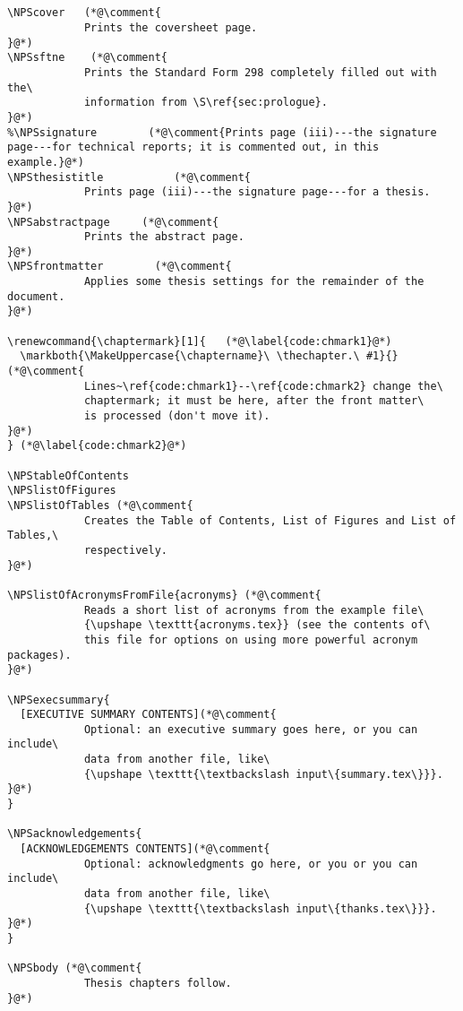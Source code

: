 \begin{lstlisting}


\NPScover   (*@\comment{
			Prints the coversheet page.
}@*)
\NPSsftne    (*@\comment{
			Prints the Standard Form 298 completely filled out with the\
			information from \S\ref{sec:prologue}.
}@*)
%\NPSsignature        (*@\comment{Prints page (iii)---the signature page---for technical reports; it is commented out, in this example.}@*)
\NPSthesistitle           (*@\comment{
			Prints page (iii)---the signature page---for a thesis.
}@*)
\NPSabstractpage     (*@\comment{
			Prints the abstract page.
}@*)
\NPSfrontmatter        (*@\comment{
			Applies some thesis settings for the remainder of the document.
}@*)

\renewcommand{\chaptermark}[1]{   (*@\label{code:chmark1}@*)
  \markboth{\MakeUppercase{\chaptername}\ \thechapter.\ #1}{}(*@\comment{
			Lines~\ref{code:chmark1}--\ref{code:chmark2} change the\
			chaptermark; it must be here, after the front matter\
			is processed (don't move it).
}@*)
} (*@\label{code:chmark2}@*)

\NPStableOfContents
\NPSlistOfFigures
\NPSlistOfTables (*@\comment{
			Creates the Table of Contents, List of Figures and List of Tables,\
			respectively.
}@*)

\NPSlistOfAcronymsFromFile{acronyms} (*@\comment{
			Reads a short list of acronyms from the example file\
			{\upshape \texttt{acronyms.tex}} (see the contents of\
			this file for options on using more powerful acronym packages).
}@*)

\NPSexecsummary{
  [EXECUTIVE SUMMARY CONTENTS](*@\comment{
  			Optional: an executive summary goes here, or you can include\
  			data from another file, like\
  			{\upshape \texttt{\textbackslash input\{summary.tex\}}}.
}@*)
}

\NPSacknowledgements{
  [ACKNOWLEDGEMENTS CONTENTS](*@\comment{
  			Optional: acknowledgments go here, or you or you can include\
  			data from another file, like\
  			{\upshape \texttt{\textbackslash input\{thanks.tex\}}}.
}@*)
}

\NPSbody (*@\comment{
			Thesis chapters follow.
}@*)
\end{lstlisting}

